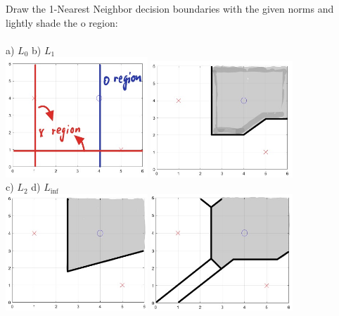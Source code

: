 \begin{enumerate}
Draw the 1-Nearest Neighbor decision boundaries with the given norms and lightly shade the o region: \\ \\ a) $L_0$ \qquad \qquad \qquad \qquad \qquad \qquad \qquad \qquad b) $L_1$\\ 
\includegraphics[width=0.4\textwidth]{images/1_NN.png}
\includegraphics[width=0.4\textwidth]{images/2_NN.png} \\
c) $L_2$ \qquad \qquad \qquad \qquad \qquad \qquad \qquad \qquad d) $L_{\inf}$\\
\includegraphics[width=0.4\textwidth]{images/3_NN.png}
\includegraphics[width=0.4\textwidth]{images/4_NN.png} \\

\end{enumerate}

